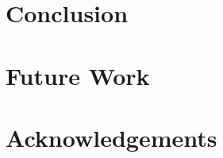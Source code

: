 \documentclass[conference]{IEEEtran}
\begin{document}

\section{Conclusion}


\section{Future Work}


\section{Acknowledgements}
\end{document}
